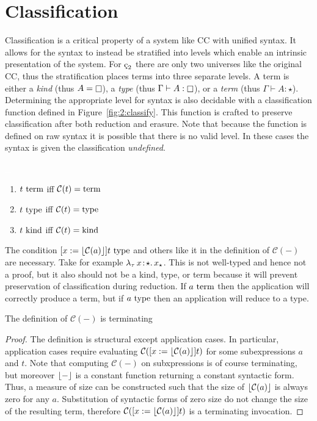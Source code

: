 \section{Classification}



Classification is a critical property of a system like CC with unified syntax.
It allows for the syntax to instead be stratified into levels which enable an intrinsic presentation of the system.
For $\ced$ there are only two universes like the original CC, thus the stratification places terms into three separate levels.
A term is either a \textit{kind} (thus $A = \kind$), a \textit{type} (thus $\Gamma \vdash A : \kind$), or a \textit{term} (thus $\Gamma \vdash A : \star$).
Determining the appropriate level for syntax is also decidable with a classification function defined in Figure~\ref{fig:2:classify}.
This function is crafted to preserve classification after both reduction and erasure.
Note that because the function is defined on raw syntax it is possible that there is no valid level.
In these cases the syntax is given the classification \textit{undefined}.

\begin{definition}
    \textcolor{white}{\_}
    \begin{enumerate}
        \item $t~\textnormal{term}$ iff $\mathcal{C}(t) =\!\!~\textnormal{term}$
        \item $t~\textnormal{type}$ iff $\mathcal{C}(t) =\!\!~\textnormal{type}$
        \item $t~\textnormal{kind}$ iff $\mathcal{C}(t) =\!\!~\textnormal{kind}$
    \end{enumerate}
\end{definition}

The condition $[x := \lfloor \mathcal{C}(a) \rfloor]t~\textnormal{type}$ and others like it in the definition of $\mathcal{C}(-)$ are necessary.
Take for example ${\lambda_\tau}\, x\! : \! \star.\, x_\star$.
This is not well-typed and hence not a proof, but it also should not be a kind, type, or term because it will prevent preservation of classification during reduction.
If $a~\textnormal{term}$ then the application will correctly produce a term, but if $a~\textnormal{type}$ then an application will reduce to a type.

\begin{lemma}
    The definition of $\mathcal{C}(-)$ is terminating
\end{lemma}
\begin{proof}
    The definition is structural except application cases.
    In particular, application cases require evaluating $\mathcal{C}([x := \lfloor \mathcal{C}(a) \rfloor]t)$ for some subexpressions $a$ and $t$.
    Note that computing $\mathcal{C}(-)$ on subxpressions is of course terminating, but moreover $\lfloor - \rfloor$ is a constant function returning a constant syntactic form.
    Thus, a measure of size can be constructed such that the size of $\lfloor \mathcal{C}(a) \rfloor$ is always zero for any $a$.
    Substitution of syntactic forms of zero size do not change the size of the resulting term, therefore $\mathcal{C}([x := \lfloor \mathcal{C}(a) \rfloor]t)$ is a terminating invocation.
\end{proof}

